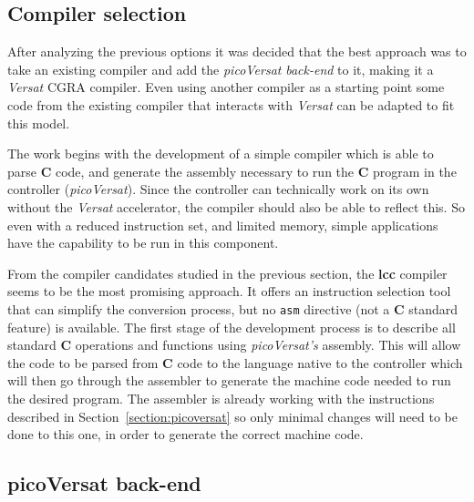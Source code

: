\documentclass[journal]{IEEEtran}
\begin{document}
\subsection{Compiler selection}

After analyzing the previous options it was decided that the best approach was
to take an existing compiler and add the {\it picoVersat} {\it back-end} to it, making
it a {\it Versat} {\sc CGRA} compiler.  Even using another compiler as a
starting point some code from the existing compiler that interacts with {\it
  Versat} can be adapted to fit this model.

The work begins with the development of a simple compiler which is able to parse
{\bf C} code, and generate the assembly necessary to run the {\bf C} program in
the controller ({\it picoVersat}).
Since the controller can technically work on its own without the {\it Versat}
accelerator, the compiler should also be able to reflect this.  So even with a
reduced instruction set, and limited memory, simple applications have the
capability to be run in this component.

From the compiler candidates studied in the previous section, the {\bf lcc}
compiler seems to be the most promising approach.  It offers
an instruction selection tool that can simplify the conversion process, but no
{\tt asm} directive (not a {\bf C} standard feature) is available.
The first stage of the development process is to describe all standard
{\bf C} operations and functions using {\it picoVersat's} assembly. This will
allow the code to be parsed from {\bf C} code to the language native to the
controller which will then go through the assembler to generate the machine code
needed to run the desired program.  The assembler is already working with the
instructions described in Section~\ref{section:picoversat} so only minimal
changes will need to be done to this one, in order to generate the correct
machine code.

\subsection{picoVersat back-end}
\end{document}
